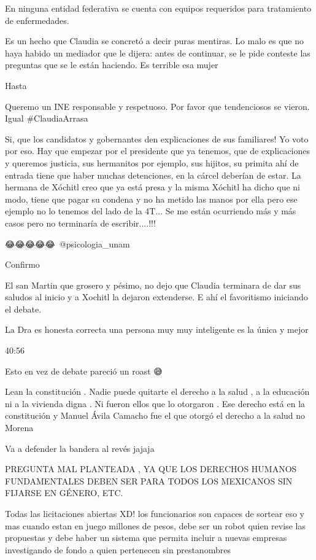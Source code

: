 En ninguna entidad federativa se cuenta con equipos requeridos para tratamiento de enfermedades.

Es un hecho que Claudia se concretó a decir puras mentiras. Lo malo es que no haya habido un mediador que le dijera: antes de continuar, se le pide conteste las preguntas que se le están haciendo. 
Es terrible esa mujer

Hasta

Queremo un INE responsable y respetuoso. Por favor que tendenciosos se vieron. Igual #ClaudiaArrasa

Si, que los candidatos y gobernantes den explicaciones de sus familiares! Yo voto por eso. Hay que empezar por el presidente que ya tenemos, que de explicaciones y queremos justicia, sus hermanitos por ejemplo, sus hijitos, su primita ahí de entrada tiene que haber muchas detenciones, en la cárcel deberían de estar. La hermana de Xóchitl creo que ya está presa y la misma Xóchitl ha dicho que ni modo, tiene que pagar su condena y no ha metido las manos por ella pero ese ejemplo no lo tenemos del lado de la 4T... Se me están ocurriendo más y más casos pero no terminaría de escribir....!!!

😂😂😂😂😂​ @psicologia_unam 

Confirmo

El san Martin que grosero y pésimo, no dejo que Claudia terminara de dar sus saludos al inicio y a Xochitl la dejaron extenderse. E ahí el favoritismo iniciando el debate.

La Dra es honesta correcta una persona muy muy inteligente es la única y mejor

40:56

Esto en vez de debate pareció un roast 😅

Lean la constitución . Nadie puede quitarte el derecho a la salud , a la educación ni a la vivienda digna . Ni fueron ellos que lo otorgaron . Ese derecho está en la constitución y Manuel Ávila Camacho fue el que otorgó el derecho a la salud no Morena

Va a defender la bandera al revés jajaja

PREGUNTA MAL PLANTEADA , YA QUE LOS DERECHOS HUMANOS FUNDAMENTALES DEBEN SER PARA TODOS LOS MEXICANOS SIN FIJARSE EN GÉNERO, ETC.

Todas las licitaciones abiertas XD! los funcionarios son capaces de sortear eso y mas cuando estan en juego millones de pesos, debe ser un robot quien revise las propuestas y debe haber un sistema que permita incluir a nuevas empresas investigando de fondo a quien pertenecen sin prestanombres

